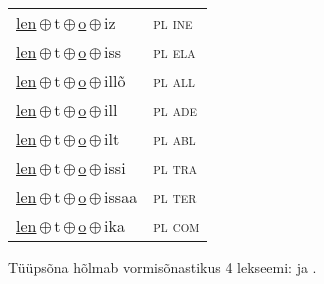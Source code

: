 \begin{minipage}{\textwidth}
\begin{sideways}
\begin{tabular}{l l}
\underline{len}\,$\oplus$\,t\,$\oplus$\,\underline{o}\,$\oplus$\,iz & \textsc{ pl ine } \\
\underline{len}\,$\oplus$\,t\,$\oplus$\,\underline{o}\,$\oplus$\,iss & \textsc{ pl ela } \\
\underline{len}\,$\oplus$\,t\,$\oplus$\,\underline{o}\,$\oplus$\,illõ & \textsc{ pl all } \\
\underline{len}\,$\oplus$\,t\,$\oplus$\,\underline{o}\,$\oplus$\,ill & \textsc{ pl ade } \\
\underline{len}\,$\oplus$\,t\,$\oplus$\,\underline{o}\,$\oplus$\,ilt & \textsc{ pl abl } \\
\underline{len}\,$\oplus$\,t\,$\oplus$\,\underline{o}\,$\oplus$\,issi & \textsc{ pl tra } \\
\underline{len}\,$\oplus$\,t\,$\oplus$\,\underline{o}\,$\oplus$\,issaa & \textsc{ pl ter } \\
\underline{len}\,$\oplus$\,t\,$\oplus$\,\underline{o}\,$\oplus$\,ika & \textsc{ pl com } \\
\end{tabular}
\end{sideways}
\label{tab:tüüpsõnamall-lento}

\end{minipage}

 
\vspace{1em}
\noindent Tüüpsõna hõlmab vormisõnastikus 4 lekseemi:  ja .
